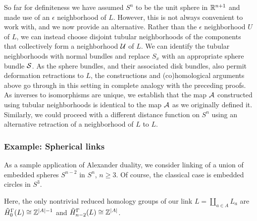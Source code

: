 \begin{comment}
	we need to consider the co-orientation of the the piece of $\bd \mr T$ corresponding to $V^0$.
	We have

	Once again,
	\begin{itemize}
		\item the $V^0$ terms should cancel once I get the signs right,
		\item since $\bd V \in Q^*(S^n-L)$ it follows that $(\bd V)^-$ and $\bd V^0=-(\bd V)^0$ are in $Q^*(S^n-L)$,
		\item and then $\bd V^0 \times [0,1) \in Q^*(S^n-L)$ since the homotopy is universal.
	\end{itemize}
\end{comment}

\begin{remark}\label{R: Alex tubular}
	So far for definiteness we have assumed $S^n$ to be the unit sphere in $\mathbb{R}^{n+1}$ and made use of an $\epsilon$ neighborhood of $L$.
	However, this is not always convenient to work with, and we now provide an alternative.
	Rather than the $\epsilon$ neighborhood $U$ of $L$, we can instead choose disjoint tubular neighborhoods of the components that collectively form a neighborhood $\mathcal{U}$ of $L$.
	We can identify the tubular neighborhoods with normal bundles and replace $S_x$ with an appropriate sphere bundle $\mathcal{S}$.
	As the sphere bundles, and their associated disk bundles, also permit deformation retractions to $L$, the constructions and (co)homological arguments above go through in this setting in complete analogy with the preceding proofs.
	As inverses to isomorphisms are unique, we establish that the map $\mathcal{A}$ constructed using tubular neighborhoods is identical to the map $\mathcal{A}$ as we originally defined it.
	Similarly, we could proceed with a different distance function on $S^n$ using an alternative retraction of a neighborhood of $L$ to $L$.
\end{remark}


\subsubsection{Example: Spherical links}

As a sample application of Alexander duality, we consider linking of a union of embedded spheres $S^{n-2}$ in $S^n$, $n \geq 3$.
Of course, the classical case is embedded circles in $S^3$.

Here, the only nontrivial reduced homology groups of our link $L = \amalg_{a \in A} L_a$ are $\tilde H_0^\Gamma(L) \cong \mathbb{Z}^{|A|-1}$ and $\tilde H_{n-2}^\Gamma(L) \cong \mathbb{Z}^{|A|}$.

